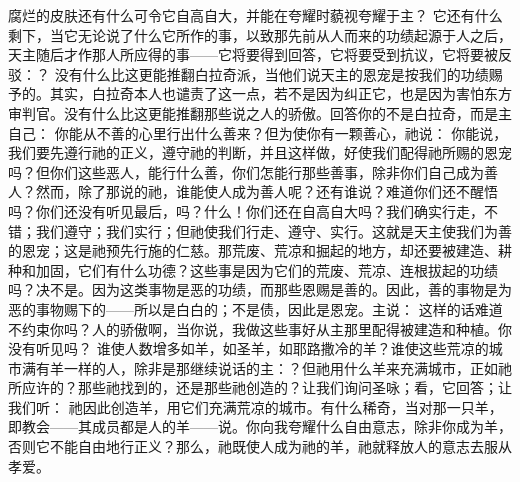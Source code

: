 腐烂的皮肤还有什么可令它自高自大，并能在夸耀时藐视夸耀于主？ 它还有什么剩下，当它无论说了什么它所作的事，以致那先前从人而来的功绩起源于人之后，天主随后才作那人所应得的事——它将要得到回答，它将要受到抗议，它将要被反驳：？ 没有什么比这更能推翻白拉奇派，当他们说天主的恩宠是按我们的功绩赐予的。其实，白拉奇本人也谴责了这一点，若不是因为纠正它，也是因为害怕东方审判官。没有什么比这更能推翻那些说之人的骄傲。回答你的不是白拉奇，而是主自己： 你能从不善的心里行出什么善来？但为使你有一颗善心，祂说： 你能说，我们要先遵行祂的正义，遵守祂的判断，并且这样做，好使我们配得祂所赐的恩宠吗？但你们这些恶人，能行什么善，你们怎能行那些善事，除非你们自己成为善人？然而，除了那说的祂，谁能使人成为善人呢？还有谁说？难道你们还不醒悟吗？你们还没有听见最后，吗？什么！你们还在自高自大吗？我们确实行走，不错；我们遵守；我们实行；但祂使我们行走、遵守、实行。这就是天主使我们为善的恩宠；这是祂预先行施的仁慈。那荒废、荒凉和掘起的地方，却还要被建造、耕种和加固，它们有什么功德？这些事是因为它们的荒废、荒凉、连根拔起的功绩吗？决不是。因为这类事物是恶的功绩，而那些恩赐是善的。因此，善的事物是为恶的事物赐下的——所以是白白的；不是债，因此是恩宠。主说： 这样的话难道不约束你吗？人的骄傲啊，当你说，我做这些事好从主那里配得被建造和种植。你没有听见吗？ 谁使人数增多如羊，如圣羊，如耶路撒冷的羊？谁使这些荒凉的城市满有羊一样的人，除非是那继续说话的主：？但祂用什么羊来充满城市，正如祂所应许的？那些祂找到的，还是那些祂创造的？让我们询问圣咏；看，它回答；让我们听： 祂因此创造羊，用它们充满荒凉的城市。有什么稀奇，当对那一只羊，即教会——其成员都是人的羊——说。你向我夸耀什么自由意志，除非你成为羊，否则它不能自由地行正义？那么，祂既使人成为祂的羊，祂就释放人的意志去服从孝爱。\par


